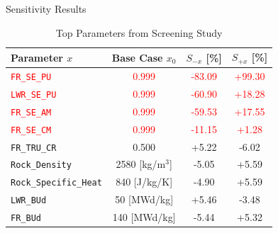 \documentclass[pdf, autumn, slideColor, nocolorBG]{prosper}
\newcommand{\superscript}[1]{\ensuremath{^{\textrm{#1}}}}
\newcommand{\Red}[1]{\textcolor{red}{#1}}
\begin{document}
\begin{slide}{Sensitivity Results}
\begin{center}
\begin{table}
\scriptsize
\caption{Top Parameters from Screening Study}
\begin{tabular}{|l|c|c|c|}
\hline
\textbf{Parameter $x$}        & \textbf{Base Case $x_0$}    & \textbf{$S_{-x}$} [\%] & \textbf{$S_{+x}$} [\%]\\
\hline
\Red{\texttt{FR\_SE\_PU}}     & \Red{0.999}                 & \Red{-83.09}      & \Red{+99.30} \\
\hline
\Red{\texttt{LWR\_SE\_PU}}    & \Red{0.999}                 & \Red{-60.90}      & \Red{+18.28} \\
\hline
\Red{\texttt{FR\_SE\_AM}}     & \Red{0.999}                 & \Red{-59.53}      & \Red{+17.55} \\
\hline
\Red{\texttt{FR\_SE\_CM}}     & \Red{0.999}                 & \Red{-11.15}      & \Red{+1.28}  \\
\hline
\texttt{FR\_TRU\_CR}          & 0.500                       & +5.22             & -6.02  \\
\hline
\texttt{Rock\_Density}        & 2580 [kg/m\superscript{3}]  & -5.05             & +5.59  \\
\hline
\texttt{Rock\_Specific\_Heat} & 840 [J/kg/K]                & -4.90             & +5.59  \\
\hline
\texttt{LWR\_BUd}             & 50 [MWd/kg]                 & +5.46             & -3.48  \\
\hline
\texttt{FR\_BUd}              & 140 [MWd/kg]                & -5.44             & +5.32  \\
\hline
\end{tabular}
\end{table}
\end{center}
\end{slide}
\end{document}
